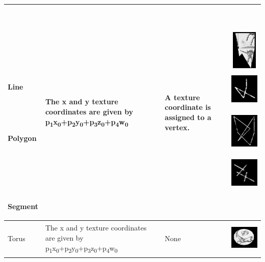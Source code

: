 \documentclass[letterpaper]{article}
\begin{document}
\begin{center}
\begin{supertabular}{|m{0.7400598in}|m{3.2761598in}|m{0.99975985in}|m{0.7483598in}|}
~

~

~

~

{ Line}

~

~

{ Polygon}

~

~

~

{ Segment} &
{ The x and y texture coordinates are given by
p\textsubscript{1}x\textsubscript{0}+p\textsubscript{2}y\textsubscript{0}+p\textsubscript{3}z\textsubscript{0}+p\textsubscript{4}w\textsubscript{0}
} &
{ A texture coordinate is assigned to a vertex. } &
 \includegraphics[width=0.6602in,height=0.7335in]{utr9/utr9-img016.jpg} 
 \includegraphics[width=0.7228in,height=0.7516in]{utr9/utr9-img017.jpg} 
 \includegraphics[width=0.7217in,height=0.8717in]{utr9/utr9-img018.jpg} 
 \includegraphics[width=0.7228in,height=0.7402in]{utr9/utr9-img019.jpg} \\\hline
{ Torus} &
{ The x and y texture coordinates are given by
p\textsubscript{1}x\textsubscript{0}+p\textsubscript{2}y\textsubscript{0}+p\textsubscript{3}z\textsubscript{0}+p\textsubscript{4}w\textsubscript{0}}
&
{ None} &
 \includegraphics[width=0.8016in,height=0.6453in]{utr9/utr9-img020.jpg} \\\hline
\end{supertabular}
\end{center}
\end{document}

